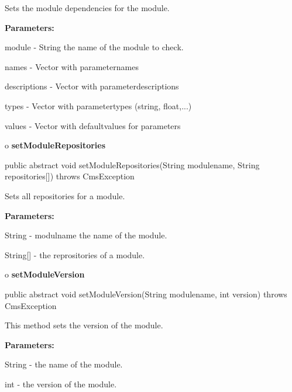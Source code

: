 \begin{description}
\htmlDD Sets the module dependencies for the module. 

\begin{description}
\item {\bf Parameters:}  

module - String the name of the module to check.  

names - Vector with parameternames  

descriptions - Vector with parameterdescriptions  

types - Vector with parametertypes (string, float,...)  

values - Vector with defaultvalues for parameters  
\end{description}

\end{description}

o {\bf setModuleRepositories} 

\begin{PRE}
 public abstract void setModuleRepositories(String modulename,
                                            String repositories[]) throws CmsException
\end{PRE}

\begin{description}
\htmlDD Sets all repositories for a module. 

\begin{description}
\item {\bf Parameters:}  

String - modulname the name of the module.  

String[] - the reprositories of a module.  
\end{description}

\end{description}

o {\bf setModuleVersion} 

\begin{PRE}
 public abstract void setModuleVersion(String modulename,
                                       int version) throws CmsException
\end{PRE}

\begin{description}
\htmlDD This method sets the version of the module. 

\begin{description}
\item {\bf Parameters:}  

String - the name of the module.  

int - the version of the module.  
\end{description}

\end{description}

